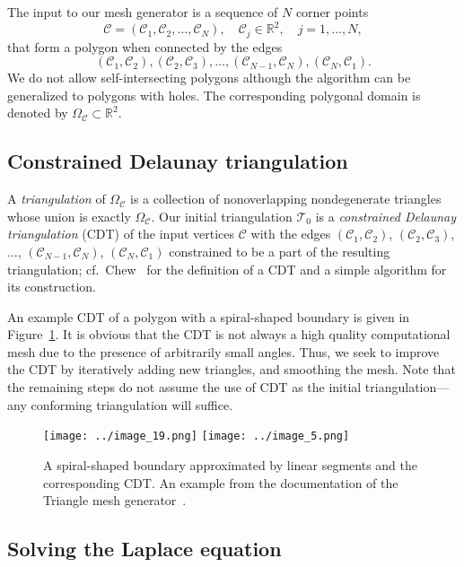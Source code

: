 \documentclass[11pt]{article}
\begin{document}
The input to
our mesh generator is a sequence of \(N\) corner points
$$\mathcal{C} = (\mathcal{C}_1, \mathcal{C}_2, \dots, \mathcal{C}_N), \quad \mathcal{C}_j \in \mathbb{R}^2, \quad j = 1,\dots,N,$$
that form a polygon when connected by the edges
$$(\mathcal{C}_1, \mathcal{C}_2), (\mathcal{C}_2,\mathcal{C}_3),
\dots, (\mathcal{C}_{N-1}, \mathcal{C}_N), (\mathcal{C}_N,\mathcal{C}_1).$$
We do not allow self-intersecting polygons although
the algorithm can be generalized to polygons
with holes.
The corresponding polygonal domain is denoted
by \(\Omega_{\mathcal{C}} \subset \mathbb{R}^2\).

\subsection{Constrained Delaunay triangulation}
\label{sec:cdt}

A \emph{triangulation} of \(\Omega_{\mathcal{C}}\) is a collection of
nonoverlapping nondegenerate triangles whose union is exactly
\(\Omega_{\mathcal{C}}\).  Our initial triangulation \(\mathcal{T}_0\) is a
\emph{constrained Delaunay triangulation} (CDT) of the input vertices
\(\mathcal{C}\) with the edges \((\mathcal{C}_1, \mathcal{C}_2)\),
\((\mathcal{C}_2,\mathcal{C}_3)\), \(\dots\), \((\mathcal{C}_{N-1},
\mathcal{C}_N)\), \((\mathcal{C}_N, \mathcal{C}_1)\) constrained to be a part of
the resulting triangulation; cf.~Chew~\cite{Chew_1987} for the definition of a
CDT and a simple algorithm for its construction.

An example CDT of a polygon with a spiral-shaped boundary is given in
Figure~\ref{fig:cdt}. It is obvious that the CDT is not always a high quality
computational mesh due to the presence of arbitrarily small angles.  Thus, we
seek to improve the CDT by iteratively adding new triangles, and smoothing the
mesh.  Note that the remaining steps do not assume the use of CDT as the initial
triangulation---any conforming triangulation will suffice.

\begin{figure}[htbp]
  \centering
  \texttt{[image: ../image\_19.png]}
  \texttt{[image: ../image\_5.png]}
\caption{A spiral-shaped boundary approximated by linear segments and the corresponding
  CDT.  An example from the documentation of the
Triangle mesh generator~\cite{shewchuk1996triangle}.}
\label{fig:cdt}
\end{figure}

\subsection{Solving the Laplace equation}
\label{sec:poisson}
\end{document}
